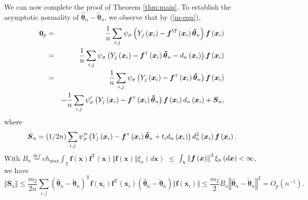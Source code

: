 \documentclass[times, authoryear, 12pt, twoside]{elsarticle}
\begin{document}
We can now complete the proof of Theorem \ref{thm:main}. To establish the asymptotic normality of $\boldsymbol{\hat{\theta}}_{n}-%
\boldsymbol{\tilde{\theta}}_{n}$, we observe that by (\ref{m-eqn}), 
\begin{eqnarray}
\boldsymbol{0}_p &=& \frac{1}{n}\sum_{i,j}\psi _{\sigma }\left( Y_{j}\left( \boldsymbol{x}%
_{i}\right) -\boldsymbol{f}^{\T }\left( \boldsymbol{x}_{i}\right) 
\boldsymbol{\hat{\theta}}_{n}\right) \boldsymbol{f}\left( \boldsymbol{x}%
_{i}\right)  \notag \\
&=&\frac{1}{n}\sum_{i,j}\psi _{\sigma }\left( Y_{j}\left( 
\boldsymbol{x}_{i}\right) -\boldsymbol{f}^{{\mathrm{\scriptscriptstyle T}}%
}\left( \boldsymbol{x}_{i}\right) \boldsymbol{\tilde{\theta}}%
_{n}-d_{n}\left( \boldsymbol{x}_{i}\right) \right) \boldsymbol{f}\left( 
\boldsymbol{x}_{i}\right)  \notag \\
\text{ }& =&\frac{1}{n}\sum_{i,j}\psi _{\sigma }\left( Y_{j}\left( \boldsymbol{x}%
_{i}\right) -\boldsymbol{f}^{{\mathrm{\scriptscriptstyle T}}}\left( 
\boldsymbol{x}_{i}\right) \boldsymbol{\tilde{\theta}}_{n}\right) \boldsymbol{%
f}\left( \boldsymbol{x}_{i}\right)   \notag \\
\text{}&&-\frac{1}{n}\sum_{i,j}\psi _{\sigma }^{\prime }\left( Y_{j}\left( \boldsymbol{x}%
_{i}\right) -\boldsymbol{f}^{{\mathrm{\scriptscriptstyle T}}}\left( 
\boldsymbol{x}_{i}\right) \boldsymbol{\tilde{\theta}}_{n}\right) \boldsymbol{%
f}\left( \boldsymbol{x}_{i}\right) d_{n}\left( \boldsymbol{x}_{i}\right) +%
\boldsymbol{S}_{n},  \label{exp2}
\end{eqnarray}%
where
\begin{equation*}
\boldsymbol{S}_{n}=\left( 1/2n\right) \sum_{i,j}\psi _{\sigma }^{\prime
\prime }\left( Y_{j}\left( \boldsymbol{x}_{i}\right) -\boldsymbol{f}^{{%
\mathrm{\scriptscriptstyle T}}}\left( \boldsymbol{x}_{i}\right) \boldsymbol{%
\tilde{\theta}}_{n}+t_id_{n}\left( \boldsymbol{x}_{i}\right) \right)
d_{n}^{2}\left( \boldsymbol{x}_{i}\right) \boldsymbol{f}\left( \boldsymbol{x}%
_{i}\right) .
\end{equation*}%
With $B_{n}\overset{def}{=}ch_{\max }\int_{\mathcal{\chi }}\boldsymbol{f}%
\left( \boldsymbol{x}\right) \boldsymbol{f}^{{\mathrm{\scriptscriptstyle T}}%
}\left( \boldsymbol{x}\right) \left\Vert \boldsymbol{f}\left( \boldsymbol{x}%
\right) \right\Vert \xi _{n}\left( d\boldsymbol{x}\right) $ $\leq $ $\int_{%
\mathcal{\chi }}\left\Vert \boldsymbol{f}\left( \boldsymbol{x}\right)
\right\Vert ^{3}\xi _{n}\left( d\boldsymbol{x}\right) <\infty $, we have 
\begin{equation*}
\left\Vert \boldsymbol{S}_{n}\right\Vert \leq \frac{m_{2}}{2n}%
\sum_{i,j}\left( \boldsymbol{\hat{\theta}}_{n}-\boldsymbol{\tilde{\theta}}%
_{n}\right) ^{{\mathrm{\scriptscriptstyle T}}}\boldsymbol{f}\left( 
\boldsymbol{x}_{i}\right) \boldsymbol{f}^{{\mathrm{\scriptscriptstyle T}}%
}\left( \boldsymbol{x}_{i}\right) \left( \boldsymbol{\hat{\theta}}_{n}-%
\boldsymbol{\tilde{\theta}}_{n}\right) \left\Vert \boldsymbol{f}\left( 
\boldsymbol{x}_{i}\right) \right\Vert \leq \frac{m_{2}}{2}B_{n}\left\Vert 
\boldsymbol{\hat{\theta}}_{n}-\boldsymbol{\tilde{\theta}}_{n}\right\Vert
^{2}=O_{p}\left( n^{-1}\right) .
\end{equation*}%
\end{document}
